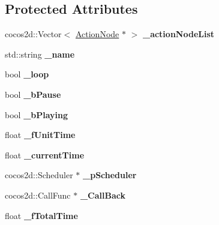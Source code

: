 \subsection*{Protected Attributes}
\begin{DoxyCompactItemize}
\item 
\mbox{\label{classcocostudio_1_1ActionObject_af8141e6637764bde799a085294662593}} 
cocos2d\+::\+Vector$<$ \hyperlink{classcocostudio_1_1ActionNode}{Action\+Node} $\ast$ $>$ {\bfseries \+\_\+action\+Node\+List}
\item 
\mbox{\label{classcocostudio_1_1ActionObject_afb0fc046e13819651d2f1c06aa612e94}} 
std\+::string {\bfseries \+\_\+name}
\item 
\mbox{\label{classcocostudio_1_1ActionObject_abad8ada1caca7a1b6e5116108e42ac24}} 
bool {\bfseries \+\_\+loop}
\item 
\mbox{\label{classcocostudio_1_1ActionObject_a0e76abfff2965138a648db8a7e783c0e}} 
bool {\bfseries \+\_\+b\+Pause}
\item 
\mbox{\label{classcocostudio_1_1ActionObject_a4ded0f66bb701493b17a0886f973adb5}} 
bool {\bfseries \+\_\+b\+Playing}
\item 
\mbox{\label{classcocostudio_1_1ActionObject_a868a716e7c95ee25b2604d43bf83df01}} 
float {\bfseries \+\_\+f\+Unit\+Time}
\item 
\mbox{\label{classcocostudio_1_1ActionObject_ad27f03163aff3c21705c1b1d699878fd}} 
float {\bfseries \+\_\+current\+Time}
\item 
\mbox{\label{classcocostudio_1_1ActionObject_aab3af9754c53e2095bf6f4f5ced9863d}} 
cocos2d\+::\+Scheduler $\ast$ {\bfseries \+\_\+p\+Scheduler}
\item 
\mbox{\label{classcocostudio_1_1ActionObject_a8213b20a418d9c700d6fac965bfed6bc}} 
cocos2d\+::\+Call\+Func $\ast$ {\bfseries \+\_\+\+Call\+Back}
\item 
\mbox{\label{classcocostudio_1_1ActionObject_ad17f7f1e7abd67f04057cda0fc1e1406}} 
float {\bfseries \+\_\+f\+Total\+Time}
\end{DoxyCompactItemize}


